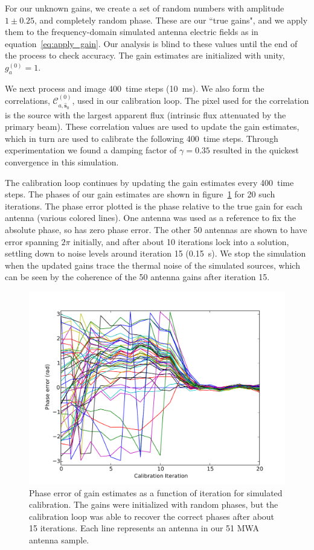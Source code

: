 \documentclass[a4paper,fleqn,usenatbib]{../mnras}
\newcommand{\spix}{\ensuremath{\hat{\mathbf{s}}_{0}}}
\newcommand{\Cna}[1][n]{\ensuremath{\mathcal{C}^{(#1)}_{a,\spix}}}
\newcommand{\caliter}{400}
\newcommand{\damp}{\ensuremath{\gamma}}
\begin{document}
For our unknown gains, we create a set of random numbers with amplitude $1\pm0.25$, and completely random phase. These are our ``true gains", and we apply them to the frequency-domain simulated antenna electric fields as in equation~\ref{eq:apply_gain}. Our analysis is blind to these values until the end of the process to check accuracy. The gain estimates are initialized with unity, $g^{(0)}_a=1$.

We next process and image \caliter~time steps (10~ms). We also form the correlations, \Cna[0], used in our calibration loop. The pixel used for the correlation is the source with the largest apparent flux (intrinsic flux attenuated by the primary beam). These correlation values are used to update the gain estimates, which in turn are used to calibrate the following \caliter~time steps. Through experimentation we found a damping factor of $\damp=0.35$ resulted in the quickest convergence in this simulation.

The calibration loop continues by updating the gain estimates every \caliter~time steps. The phases of our gain estimates are shown in figure~\ref{fig:sim_phase} for 20 such iterations. The phase error plotted is the phase relative to the true gain for each antenna (various colored lines). One antenna was used as a reference to fix the absolute phase, so has zero phase error. The other 50 antennas are shown to have error spanning $2\pi$ initially, and after about 10 iterations lock into a solution, settling down to noise levels around iteration 15 (0.15~s). We stop the simulation when the updated gains trace the thermal noise of the simulated sources, which can be seen by the coherence of the 50 antenna gains after iteration 15.

\begin{figure}
\begin{center}
\includegraphics[width=\columnwidth]{figures/cal_paper_sim_phase.pdf}
\caption{Phase error of gain estimates as a function of iteration for simulated calibration. The gains were initialized with random phases, but the calibration loop was able to recover the correct phases after about 15 iterations. Each line represents an antenna in our 51 MWA antenna sample.
}
\label{fig:sim_phase}
\end{center}
\end{figure}
\end{document}
